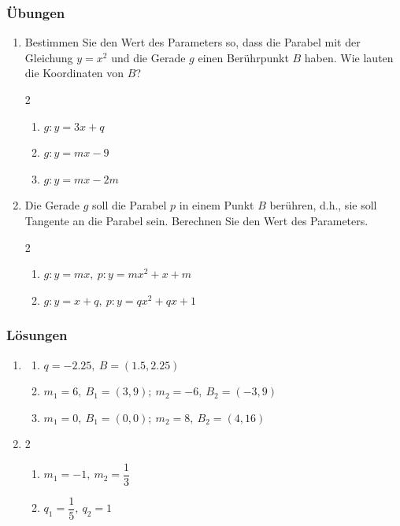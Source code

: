 \subsubsection{Übungen}
\begin{enumerate}
    \item Bestimmen Sie den Wert des Parameters so, dass die Parabel mit der Gleichung $y=x^2$ und die Gerade $g$ einen Berührpunkt $B$ haben. Wie lauten die Koordinaten von $B$?
          \begin{multicols}{2}
              \begin{enumerate}
                  \item $g: y=3x+q$
                  \item $g: y=mx-9$
                  \item $g:y=mx-2m$
              \end{enumerate}
          \end{multicols}
    \item Die Gerade $g$ soll die Parabel $p$ in einem Punkt $B$ berühren, d.h., sie soll Tangente an die Parabel sein. Berechnen Sie den Wert des Parameters.
          \begin{multicols}{2}
              \begin{enumerate}
                  \item $g: y=mx,\ p:y=mx^2+x+m$
                  \item $g: y=x+q,\ p:y=qx^2+qx+1$
              \end{enumerate}
          \end{multicols}
\end{enumerate}
\newpage
\subsubsection*{Lösungen}
\begin{enumerate}
    \item
          \begin{enumerate}
              \item $q=-2.25,\ B=(1.5, 2.25)$
              \item $m_1=6,\ B_1=(3,9);\ m_2=-6,\ B_2=(-3,9)$
              \item $m_1=0,\ B_1=(0,0);\ m_2=8,\ B_2=(4,16)$
          \end{enumerate}
    \item
          \begin{multicols}{2}
              \begin{enumerate}
                  \item $m_1=-1,\ m_2=\dfrac{1}{3}$
                  \item $q_1=\dfrac{1}{5},\ q_2=1$
              \end{enumerate}
          \end{multicols}
\end{enumerate}
\newpage
